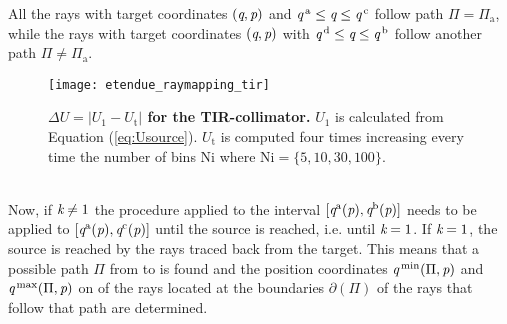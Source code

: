 All the rays with target coordinates $(\textit{q}, \textit{p})$ and $\textit{q}^{\,\textrm{a}}\leq\textit{q}\leq\textit{q}^{\,\textrm{c}}$ follow path $\Pi = \Pi_{\textrm{a}}$, while the rays with target coordinates $(\textit{q}, \textit{p})$ with $\textit{q}^{\,\textrm{d}}\leq\textit{q}\leq\textit{q}^{\,\textrm{b}}$ follow another path $\Pi \neq \Pi_{\textrm{a}}.$ 
\begin{figure}[h]
  \begin{center}
  \texttt{[image: etendue\_raymapping\_tir]}
  \end{center}
  \caption{\textbf{$\Delta U = |U_1 - U_{\textrm{t}}|$ for the TIR-collimator.}
 $U_1$ is calculated from Equation (\ref{eq:Usource}). $U_{\textrm{t}}$ is computed four times increasing every time the number of bins $\textrm{Ni}$ where $\textrm{Ni}=\{5,10,30,100\}$. }
\label{fig:etendue_raymapping_tir}
 \end{figure}
\\ \indent Now, if $\textit{k}\neq1$ the procedure applied to the interval 
$[\textit{q}^{\textrm{a}}(\textit{p}), \textit{q}^{\textrm{b}}(\textit{p})]$ needs to be applied to $[\textit{q}^{\textrm{a}}(\textit{p}),\textit{q}^{\textrm{c}}(\textit{p})]$ until the source is reached, i.e. until $\textit{k}=1$. If $\textit{k}=1$, the source is reached by the rays traced back from the target. This means that a possible path $\Pi$ from  to  is found and the position coordinates $\textit{q}^{\textrm{\,min}}(\Pi, \textit{p})$ and $\textit{q}^{\textrm{\,max}}(\Pi, \textit{p})$ on  of the rays located at the boundaries $\partial$$(\Pi)$ of the rays that follow that path are determined. \\ \indent 
